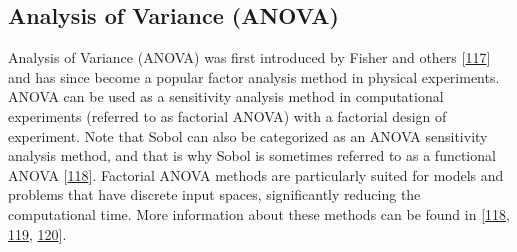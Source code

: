 \documentclass[letterpaper,10pt,english]{sphinxmanual}
\begin{document}
\subsection{Analysis of Variance (ANOVA)}
\label{\detokenize{3_sensitivity_analysis_the_basics:analysis-of-variance-anova}}
\sphinxAtStartPar
Analysis of Variance (ANOVA) was first introduced by Fisher and others {[}\hyperlink{cite.index:id144}{117}{]} and has since become a popular factor analysis method in physical experiments. ANOVA can be used as a sensitivity analysis method in computational experiments (referred to as factorial ANOVA) with a factorial design of experiment. Note that Sobol can also be categorized as an ANOVA sensitivity analysis method, and that is why Sobol is sometimes referred to as a functional ANOVA {[}\hyperlink{cite.index:id145}{118}{]}. Factorial ANOVA methods are particularly suited for models and problems that have discrete input spaces, significantly reducing the computational time. More information about these methods can be found in {[}\hyperlink{cite.index:id145}{118}, \hyperlink{cite.index:id146}{119}, \hyperlink{cite.index:id147}{120}{]}.
\end{document}
